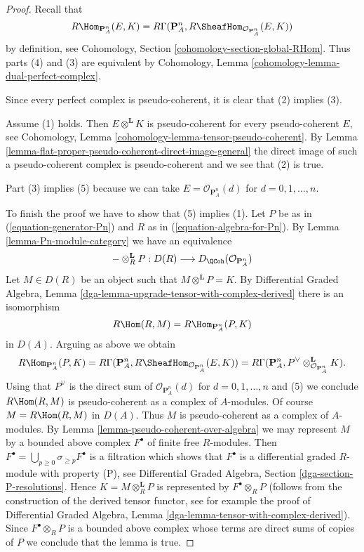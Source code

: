 \begin{proof}
Recall that
$$
R\Hom_{\mathbf{P}^n_A}(E, K) =
R\Gamma(\mathbf{P}^n_A, R\SheafHom_{\mathcal{O}_{\mathbf{P}^n_A}}(E, K))
$$
by definition, see Cohomology, Section \ref{cohomology-section-global-RHom}.
Thus parts (4) and (3) are equivalent by
Cohomology, Lemma \ref{cohomology-lemma-dual-perfect-complex}.

\medskip\noindent
Since every perfect complex is pseudo-coherent, it is clear that
(2) implies (3).

\medskip\noindent
Assume (1) holds. Then $E \otimes^\mathbf{L} K$ is pseudo-coherent
for every pseudo-coherent $E$, see
Cohomology, Lemma \ref{cohomology-lemma-tensor-pseudo-coherent}.
By Lemma \ref{lemma-flat-proper-pseudo-coherent-direct-image-general}
the direct image of such a pseudo-coherent complex is pseudo-coherent
and we see that (2) is true.

\medskip\noindent
Part (3) implies (5) because we can take $E = \mathcal{O}_{\mathbf{P}^n_A}(d)$
for $d = 0, 1, \ldots, n$.

\medskip\noindent
To finish the proof we have to show that (5) implies (1).
Let $P$ be as in (\ref{equation-generator-Pn}) and
$R$ as in (\ref{equation-algebra-for-Pn}).
By Lemma \ref{lemma-Pn-module-category} we have an equivalence
$$
- \otimes^\mathbf{L}_R P :
D(R) \longrightarrow D_\QCoh(\mathcal{O}_{\mathbf{P}^n_A})
$$
Let $M \in D(R)$ be an object such that $M \otimes^\mathbf{L} P = K$.
By Differential Graded Algebra, Lemma
\ref{dga-lemma-upgrade-tensor-with-complex-derived}
there is an isomorphism
$$
R\Hom(R, M) = R\Hom_{\mathbf{P}^n_A}(P, K)
$$
in $D(A)$. Arguing as above we obtain
$$
R\Hom_{\mathbf{P}^n_A}(P, K) = R\Gamma(\mathbf{P}^n_A,
R\SheafHom_{\mathcal{O}_{\mathbf{P}^n_A}}(E, K)) =
R\Gamma(\mathbf{P}^n_A,
P^\vee \otimes^\mathbf{L}_{\mathcal{O}_{\mathbf{P}^n_A}} K).
$$
Using that $P^\vee$ is the direct sum of
$\mathcal{O}_{\mathbf{P}^n_A}(d)$ for $d = 0, 1, \ldots, n$
and (5) we conclude $R\Hom(R, M)$ is pseudo-coherent as a complex
of $A$-modules. Of course $M = R\Hom(R, M)$ in $D(A)$.
Thus $M$ is pseudo-coherent as a complex of $A$-modules.
By Lemma \ref{lemma-pseudo-coherent-over-algebra}
we may represent $M$ by a bounded above complex $F^\bullet$
of finite free $R$-modules. Then
$F^\bullet = \bigcup_{p \geq 0} \sigma_{\geq p}F^\bullet$
is a filtration which shows that $F^\bullet$ is a differential
graded $R$-module with property (P), see
Differential Graded Algebra, Section \ref{dga-section-P-resolutions}.
Hence $K = M \otimes^\mathbf{L}_R P$ is represented
by $F^\bullet \otimes_R P$ (follows from the construction of the
derived tensor functor, see for example the proof of
Differential Graded Algebra, Lemma \ref{dga-lemma-tensor-with-complex-derived}).
Since $F^\bullet \otimes_R P$
is a bounded above complex whose terms are direct sums of
copies of $P$ we conclude that the lemma is true.
\end{proof}

